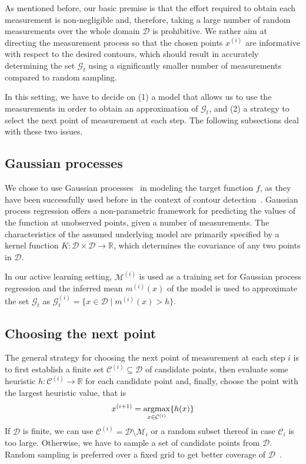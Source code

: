 \documentclass[11pt]{article} %
\newcommand{\argmax}{\operatornamewithlimits{argmax}}
\begin{document}
As mentioned before, our basic premise is that the effort required to obtain
each measurement is
non-negligible and, therefore, taking a large number of random measurements
over the whole domain $\mathcal{D}$ is prohibitive. We rather aim at directing
the measurement process so that the chosen points $x^{(i)}$ are informative with
respect to the desired contours, which should result in accurately determining
the set $\mathcal{G}_t$ using a significantly smaller number of measurements
compared to random sampling.

In this setting, we have to decide on (1) a model that allows us to use the
measurements in order to obtain an approximation of $\mathcal{G}_t$, and (2) a
strategy to select the next point of measurement at each step. The following
subsections deal with these two issues.

\subsection{Gaussian processes}
We chose to use Gaussian processes~\cite{gpbook} in modeling the target
function $f$, as they have been successfully used before in the context of
contour detection~\cite{bryan2005, bryan2008}. Gaussian process regression
offers a non-parametric framework for predicting the values of the function at
unobserved points, given a number of measurements. The characteristics of
the assumed underlying model are primarily specified by a kernel function
${K : \mathcal{D} \times \mathcal{D} \to \mathbb{R}}$, which determines the
covariance of any two points in $\mathcal{D}$.

In our active learning setting, $\mathcal{M}^{(i)}$ is used as a training set
for Gaussian process regression and the inferred mean $m^{(i)}(x)$ of the
model is used to approximate the set $\mathcal{G}_t$ as
${\mathcal{G}^{(i)}_t = \{x \in \mathcal{D} \mid m^{(i)}(x) > h\}}$.

\subsection{Choosing the next point}
The general strategy for choosing the next point of measurement at each step $i$
is to first establish a finite set $\mathcal{C}^{(i)} \subseteq \mathcal{D}$ of
candidate points, then evaluate some heuristic
${h : \mathcal{C}^{(i)} \to \mathbb{R}}$ for each candidate point and, finally,
choose the point with the largest heuristic value, that is
\begin{align*}
  x^{(i+1)} = \underset{x \in \mathcal{C}^{(i)}}{\argmax}\{h(x)\}
\end{align*}
If $\mathcal{D}$ is finite, we can use
$\mathcal{C}^{(i)} = \mathcal{D}\setminus\mathcal{M}_i$ or a random subset
thereof in case $\mathcal{C}_i$ is too large. Otherwise, we have to sample a set
of candidate points from $\mathcal{D}$. Random sampling is preferred over a
fixed grid to get better coverage of $\mathcal{D}$~\cite{bryan2005}.
\end{document}
